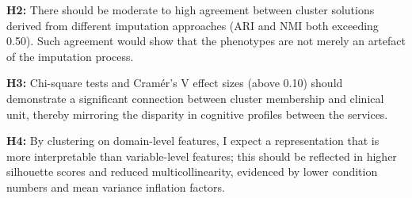 \textbf{H2:} There should be moderate to high agreement between cluster solutions derived from different imputation approaches (ARI and NMI both exceeding 0.50). Such agreement would show that the phenotypes are not merely an artefact of the imputation process.

\textbf{H3:} Chi-square tests and Cram\'{e}r's V effect sizes (above 0.10) should demonstrate a significant connection between cluster membership and clinical unit, thereby mirroring the disparity in cognitive profiles between the services.

\textbf{H4:} By clustering on domain-level features, I expect a representation that is more interpretable than variable-level features; this should be reflected in higher silhouette scores and reduced multicollinearity, evidenced by lower condition numbers and mean variance inflation factors.


